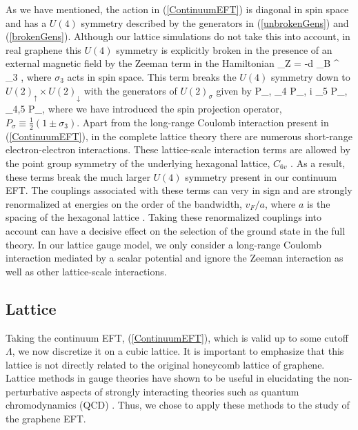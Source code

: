 \documentclass[aps,prd,twocolumn,showpacs,superscriptaddress,groupedaddress]{revtex4}  %
\begin{document}
As we have mentioned, the action in (\ref{ContinuumEFT}) is diagonal in spin space and has a $U(4)$ symmetry described by the generators in (\ref{unbrokenGens}) and (\ref{brokenGens}).  
Although our lattice simulations do not take this into account, in real graphene this $U(4)$ symmetry is explicitly broken in the presence of an external magnetic field by the Zeeman term in the Hamiltonian
\beq
{}_Z = -\int d \mu_B \Psi^{\dagger} \sigma_3 \Psi,
\eeq
where $\sigma_3$ acts in spin space.
This term breaks the $U(4)$ symmetry down to $U(2)_{\uparrow} \times U(2)_{\downarrow}$ with the generators of $U(2)_{\sigma}$ given by
\beq
\label{U2Generators}
 \otimes P_{\sigma}, \quad \tilde{\gamma}_4 \otimes P_{\sigma}, \quad i \tilde{\gamma}_5 \otimes P_{\sigma}, \quad \tilde{\gamma}_{4,5} \otimes P_{\sigma},
\eeq
where we have introduced the spin projection operator, $P_{\sigma} \equiv \frac{1}{2}( 1 \pm \sigma_3 )$.  Apart from the long-range Coulomb interaction present in (\ref{ContinuumEFT}), in the complete lattice
theory there are numerous short-range electron-electron interactions. These lattice-scale interaction terms are allowed by the point group symmetry of the underlying hexagonal lattice, $C_{6v}$ \cite{Aleiner}.
As a result, these terms break the much larger $U(4)$ symmetry present in our continuum EFT. The couplings associated with these terms can very in sign and are strongly renormalized at energies on the order of the bandwidth, $v_F/a$, where $a$ is the spacing of the hexagonal lattice \cite{Kharitonov}.
Taking these renormalized couplings into account can have a decisive effect on the selection of the ground state in the full theory. In our lattice gauge model, we only consider a long-range Coulomb interaction mediated by a scalar potential and ignore the Zeeman interaction as well as 
other lattice-scale interactions. 
\subsection{\label{sec:Lattice}Lattice}
Taking the continuum EFT, (\ref{ContinuumEFT}), which is valid up to some cutoff $\Lambda$, we now discretize it on a cubic lattice. It is important to emphasize that this lattice is not 
directly related to the original honeycomb lattice of graphene. Lattice methods in gauge theories have shown to be useful in elucidating the non-perturbative aspects of strongly interacting theories such as quantum chromodynamics (QCD) \cite{DeGrandDeTar}.
Thus, we chose to apply these methods to the study of the graphene EFT.
\end{document}
